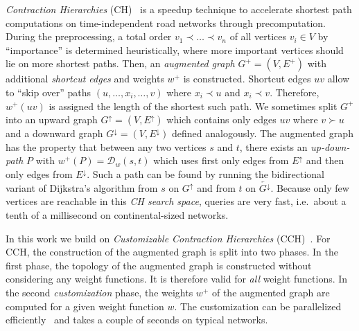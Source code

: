 \documentclass[a4paper,UKenglish,cleveref, autoref, thm-restate,anonymous]{lipics-v2021}
\newcommand*{\dist}{\mathcal{D}}
\newcommand*{\gchu}{G^{\uparrow}}
\newcommand*{\gchd}{\overleftarrow{G^{\downarrow}}}
\newcommand*{\echu}{E^{\uparrow}}
\newcommand*{\echd}{E^{\downarrow}}
\begin{document}

\emph{Contraction Hierarchies} (CH)~\cite{gssv-erlrn-12} is a speedup technique to accelerate shortest path computations on time-independent road networks through precomputation.
During the preprocessing, a total order $v_1 \prec \dots \prec v_n$ of all vertices $v_i \in V$ by ``importance'' is determined heuristically, where more important vertices should lie on more shortest paths.
Then, an \emph{augmented graph} $G^+ = (V, E^+)$ with additional \emph{shortcut edges} and weights $w^+$ is constructed.
Shortcut edges $uv$ allow to ``skip over'' paths $(u,\dots,x_i,\dots,v)$ where $x_i \prec u$ and $x_i \prec v$.
Therefore, $w^+(uv)$ is assigned the length of the shortest such path.
We sometimes split $G^+$ into an upward graph $\gchu = (V, \echu)$ which contains only edges $uv$ where $v \succ u$ and a downward graph $G^{\downarrow} = (V, E^{\downarrow})$ defined analogously.
The augmented graph has the property that between any two vertices $s$ and $t$, there exists an \emph{up-down-path} $P$ with $w^+(P) = \dist_w(s,t)$ which uses first only edges from $\echu$ and then only edges from $\echd$.
Such a path can be found by running the bidirectional variant of Dijkstra's algorithm from $s$ on $\gchu$ and from $t$ on $\gchd$.
Because only few vertices are reachable in this \emph{CH search space}, queries are very fast, i.e.\ about a tenth of a millisecond on continental-sized networks.

In this work we build on \emph{Customizable Contraction Hierarchies} (CCH)~\cite{dsw-cch-15}.
For CCH, the construction of the augmented graph is split into two phases.
In the first phase, the topology of the augmented graph is constructed without considering any weight functions.
It is therefore valid for \emph{all} weight functions.
In the second \emph{customization} phase, the weights $w^+$ of the augmented graph are computed for a given weight function $w$.
The customization can be parallelized efficiently~\cite{bsw-rttau-19} and takes a couple of seconds on typical networks.

\end{document}

